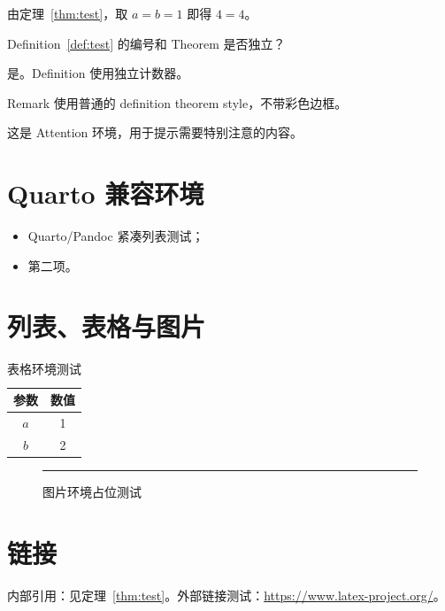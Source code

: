 \begin{example}[测试例子]
由定理~\ref{thm:test}，取 $a=b=1$ 即得 $4=4$。
\end{example}

\begin{question}[测试问题]
Definition~\ref{def:test} 的编号和 Theorem 是否独立？
\end{question}

\begin{solution}
是。Definition 使用独立计数器。
\end{solution}

\begin{remark}[测试注记]
Remark 使用普通的 definition theorem style，不带彩色边框。
\end{remark}

\begin{attention}
这是 Attention 环境，用于提示需要特别注意的内容。
\end{attention}

\section{Quarto 兼容环境}

\begin{itemize}
  \tightlist
  \item Quarto/Pandoc 紧凑列表测试；
  \item 第二项。
\end{itemize}

\begin{Shaded}
\begin{Highlighting}[]
\OperatorTok{(}\OperatorTok{)}
\end{Highlighting}
\end{Shaded}

\section{列表、表格与图片}

\begin{table}[H]
  \centering
  \caption{表格环境测试}
  \begin{tabular}{c c}
    \toprule
    参数 & 数值 \\
    \midrule
    $a$ & 1 \\
    $b$ & 2 \\
    \bottomrule
  \end{tabular}
\end{table}

\begin{figure}[H]
  \centering
  \rule{0.6\textwidth}{0.28\textwidth}
  \caption{图片环境占位测试}
\end{figure}

\section{链接}

内部引用：见定理~\ref{thm:test}。外部链接测试：\url{https://www.latex-project.org/}。
